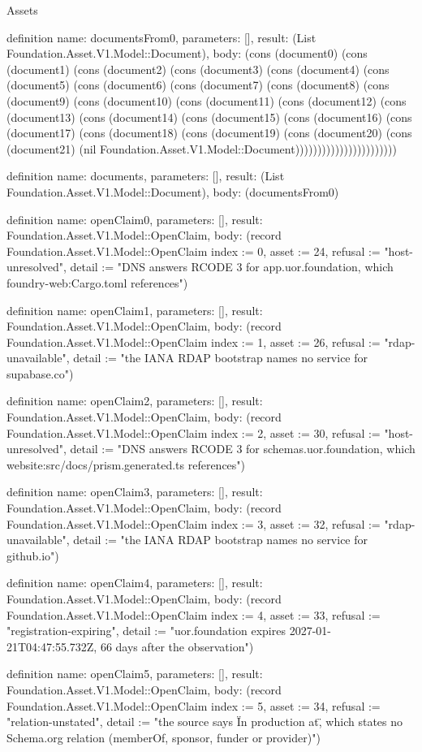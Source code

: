 \begin{lexlean}{Assets}
\begin{semanticmodule}
definition{
  name: documentsFrom0,
  parameters: [],
  result: (List Foundation.Asset.V1.Model::Document),
  body: (cons (document0) (cons (document1) (cons (document2) (cons (document3) (cons (document4) (cons (document5) (cons (document6) (cons (document7) (cons (document8) (cons (document9) (cons (document10) (cons (document11) (cons (document12) (cons (document13) (cons (document14) (cons (document15) (cons (document16) (cons (document17) (cons (document18) (cons (document19) (cons (document20) (cons (document21) (nil Foundation.Asset.V1.Model::Document)))))))))))))))))))))))
}

definition{
  name: documents,
  parameters: [],
  result: (List Foundation.Asset.V1.Model::Document),
  body: (documentsFrom0)
}

definition{
  name: openClaim0,
  parameters: [],
  result: Foundation.Asset.V1.Model::OpenClaim,
  body: (record Foundation.Asset.V1.Model::OpenClaim {index := 0, asset := 24, refusal := "host-unresolved", detail := "DNS answers RCODE 3 for app.uor.foundation, which foundry-web:Cargo.toml references"})
}

definition{
  name: openClaim1,
  parameters: [],
  result: Foundation.Asset.V1.Model::OpenClaim,
  body: (record Foundation.Asset.V1.Model::OpenClaim {index := 1, asset := 26, refusal := "rdap-unavailable", detail := "the IANA RDAP bootstrap names no service for supabase.co"})
}

definition{
  name: openClaim2,
  parameters: [],
  result: Foundation.Asset.V1.Model::OpenClaim,
  body: (record Foundation.Asset.V1.Model::OpenClaim {index := 2, asset := 30, refusal := "host-unresolved", detail := "DNS answers RCODE 3 for schemas.uor.foundation, which website:src/docs/prism.generated.ts references"})
}

definition{
  name: openClaim3,
  parameters: [],
  result: Foundation.Asset.V1.Model::OpenClaim,
  body: (record Foundation.Asset.V1.Model::OpenClaim {index := 3, asset := 32, refusal := "rdap-unavailable", detail := "the IANA RDAP bootstrap names no service for github.io"})
}

definition{
  name: openClaim4,
  parameters: [],
  result: Foundation.Asset.V1.Model::OpenClaim,
  body: (record Foundation.Asset.V1.Model::OpenClaim {index := 4, asset := 33, refusal := "registration-expiring", detail := "uor.foundation expires 2027-01-21T04:47:55.732Z, 66 days after the observation"})
}

definition{
  name: openClaim5,
  parameters: [],
  result: Foundation.Asset.V1.Model::OpenClaim,
  body: (record Foundation.Asset.V1.Model::OpenClaim {index := 5, asset := 34, refusal := "relation-unstated", detail := "the source says \"In production at\", which states no Schema.org relation (memberOf, sponsor, funder or provider)"})
}


\end{semanticmodule}
\end{lexlean}

